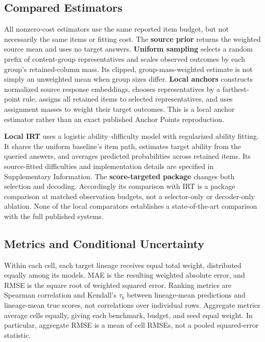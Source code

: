 \documentclass{article}
\begin{document}
\subsection{Compared Estimators}
All nonzero-cost estimators use the same reported item budget, but not necessarily the same items or fitting cost. The \textbf{source prior} returns the weighted source mean and uses no target answers. \textbf{Uniform sampling} selects a random prefix of content-group representatives and scales observed outcomes by each group's retained-column mass. Its clipped, group-mass-weighted estimate is not simply an unweighted mean when group sizes differ. \textbf{Local anchors} constructs normalized source response embeddings, chooses representatives by a farthest-point rule, assigns all retained items to selected representatives, and uses assignment masses to weight their target outcomes. This is a local anchor estimator rather than an exact published Anchor Points reproduction.

\textbf{Local IRT} uses a logistic ability--difficulty model with regularized ability fitting. It shares the uniform baseline's item path, estimates target ability from the queried answers, and averages predicted probabilities across retained items. Its source-fitted difficulties and implementation details are specified in Supplementary Information. The \textbf{score-targeted package} changes both selection and decoding. Accordingly its comparison with IRT is a package comparison at matched observation budgets, not a selector-only or decoder-only ablation. None of the local comparators establishes a state-of-the-art comparison with the full published systems.

\subsection{Metrics and Conditional Uncertainty}
Within each cell, each target lineage receives equal total weight, distributed equally among its models. MAE is the resulting weighted absolute error, and RMSE is the square root of weighted squared error. Ranking metrics are Spearman correlation and Kendall's $\tau_b$ between lineage-mean predictions and lineage-mean true scores, not correlations over individual rows. Aggregate metrics average cells equally, giving each benchmark, budget, and seed equal weight. In particular, aggregate RMSE is a mean of cell RMSEs, not a pooled squared-error statistic.
\end{document}
